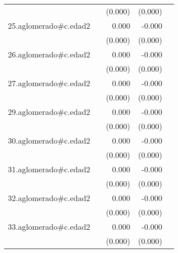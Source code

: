 {\begin{longtable}{l*{4}{D{.}{.}{-1}}}
            &                     &     (0.000)         &     (0.000)         &                     \\
\addlinespace
25.aglomerado#c.edad2&                     &       0.000         &      -0.000\sym{*}  &                     \\
            &                     &     (0.000)         &     (0.000)         &                     \\
\addlinespace
26.aglomerado#c.edad2&                     &       0.000\sym{*}  &      -0.000         &                     \\
            &                     &     (0.000)         &     (0.000)         &                     \\
\addlinespace
27.aglomerado#c.edad2&                     &       0.000         &      -0.000         &                     \\
            &                     &     (0.000)         &     (0.000)         &                     \\
\addlinespace
29.aglomerado#c.edad2&                     &       0.000\sym{*}  &      -0.000         &                     \\
            &                     &     (0.000)         &     (0.000)         &                     \\
\addlinespace
30.aglomerado#c.edad2&                     &       0.000         &      -0.000\sym{**} &                     \\
            &                     &     (0.000)         &     (0.000)         &                     \\
\addlinespace
31.aglomerado#c.edad2&                     &       0.000         &      -0.000\sym{**} &                     \\
            &                     &     (0.000)         &     (0.000)         &                     \\
\addlinespace
32.aglomerado#c.edad2&                     &       0.000         &      -0.000\sym{***}&                     \\
            &                     &     (0.000)         &     (0.000)         &                     \\
\addlinespace
33.aglomerado#c.edad2&                     &       0.000\sym{**} &      -0.000\sym{***}&                     \\
            &                     &     (0.000)         &     (0.000)         &                     \\

\end{longtable}}
